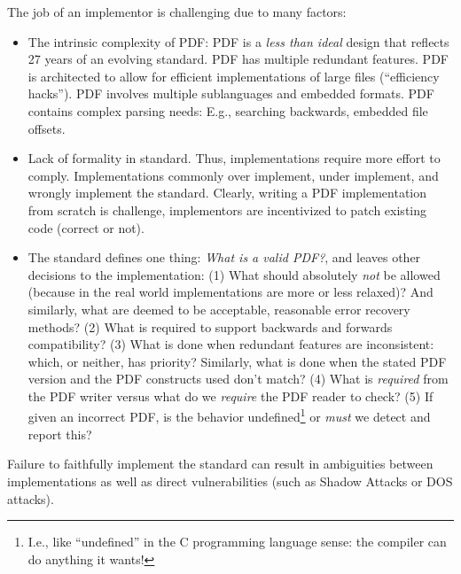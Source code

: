 The job of an implementor is challenging due to many factors:
\begin{itemize}
\item The intrinsic complexity of PDF:
  PDF is a \emph{less than ideal} design that reflects 27 years of
  an evolving standard.
  PDF has multiple redundant features.
  PDF is architected to allow for efficient implementations of
  large files (``efficiency hacks'').
  PDF involves multiple sublanguages and embedded formats.
  PDF contains complex parsing needs:
  E.g., searching backwards, embedded file offsets.
\item Lack of formality in standard. Thus, implementations
  require more effort to comply.
  Implementations commonly over implement, under implement,
  and wrongly implement the standard.
  Clearly, writing a PDF implementation from scratch is challenge,
  implementors are incentivized to patch existing code (correct or not).
\item The standard defines one thing: \emph{What is a valid PDF?},
  and leaves other decisions to the implementation:
  (1) What should absolutely \emph{not} be allowed (because in the real world
    implementations are more or less relaxed)? And similarly,
    what are deemed to be acceptable, reasonable error recovery methods?
  (2) What is required to support backwards and forwards compatibility?
  (3) What is done when redundant features are inconsistent: which, or
    neither, has priority?
    Similarly, what is done when the stated PDF version and the PDF
    constructs used don't match?
  (4) What is \emph{required} from the PDF writer versus
    what do we \emph{require} the PDF reader to check?
  (5) If given an incorrect PDF, is the behavior undefined\footnote{
      I.e., like ``undefined'' in the C programming language sense: the
      compiler can do anything it wants!
    } or \emph{must} we detect and report this?
\end{itemize}
Failure to faithfully implement the standard can result in ambiguities
between implementations as well as direct vulnerabilities (such as
Shadow Attacks or DOS attacks).

